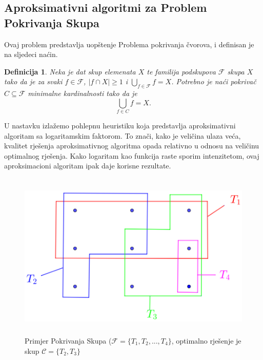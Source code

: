 \documentclass[a4paper, utf8, 11pt, colorlinks]{book}
\newtheorem{definition}{Definicija}
\begin{document}
 \subsection{Aproksimativni algoritmi za Problem Pokrivanja Skupa}
Ovaj problem predstavlja uopštenje Problema pokrivanja čvorova, i definisan je na sljedeci naćin.
\begin{definition}
	    Neka je dat skup elemenata $X$ te familija podskupova $\mathcal{F}$ skupa $X$ tako da je za svaki $f\in \mathcal{F}$, $|f \cap X| \geq 1$ i $\bigcup_{f \in \mathcal{F}} f = X$. 
	    Potrebno je naći pokrivač $C \subseteq \mathcal{F}$ minimalne kardinalnosti tako da je 
	    $$ \bigcup_{f \in C} f = X.$$
\end{definition}
 U nastavku izlažemo pohlepnu heuristiku koja predstavlja aproksimativni algoritam sa logaritamskim faktorom. To znači, kako je veličina ulaza veća, kvalitet rješenja aproksimativnog algoritma opada relativno u odnosu na veličinu optimalnog rješenja. Kako logaritam kao funkcija raste sporim intenzitetom, ovaj aproksimacioni algoritam ipak daje korisne rezultate.

\begin{figure}
	\centering
	\includegraphics[width=120mm, height=80mm]{set-cover-1.eps}
	\caption{Primjer Pokrivanja Skupa ($\mathcal{F}=\{T_1,T_2,...,T_4\}$, optimalno rješenje je skup $\mathcal{C}=\{T_2, T_3\}$}
	 \label{fig:set-cover-1}
\end{figure}
\end{document}
